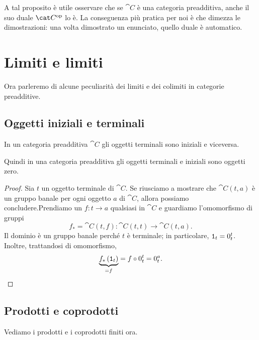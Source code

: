 \begin{remark}
  A tal proposito è utile osservare che se \(\cat C\) è una categoria
  preadditiva, anche il suo duale \(\opcat C\) lo è. La conseguenza più
  pratica per noi è che dimezza le dimostrazioni: una volta dimostrato
  un enunciato, quello duale è automatico.
\end{remark}



\section{Limiti e limiti}

Ora parleremo di alcune peculiarità dei limiti e dei colimiti in
categorie preadditive.


\subsection{Oggetti iniziali e terminali}

\begin{proposition}
  In un categoria preadditiva \(\cat C\) gli oggetti terminali sono
  iniziali e viceversa.
\end{proposition}

Quindi in una categoria preadditiva gli oggetti terminali e iniziali
sono oggetti zero.

\begin{proof}
  Sia \(t\) un oggetto terminale di \(\cat C\). Se riusciamo a
  mostrare che \(\cat C(t, a)\) è un gruppo banale per ogni oggetto
  \(a\) di \(\cat C\), allora possiamo concludere.\newline Prendiamo un
  \(f : t \to a\) qualsiasi in \(\cat C\) e guardiamo l'omomorfismo di
  gruppi
  \[
    f_\ast = \cat C(t, f) : \cat C(t, t) \to \cat C(t, a) .
  \]
  Il dominio è un gruppo banale perché \(t\) è terminale; in
  particolare, \(\mathtt 1_t = 0_t^t\). Inoltre, trattandosi di omomorfismo,
  \[
    \underbrace{f_\ast \left(\id_t\right)}_{= f} = f \circ 0_t^t = 0_t^a
    . \qedhere
  \]
\end{proof}


\subsection{Prodotti e coprodotti}

Vediamo i prodotti e i coprodotti finiti ora.

